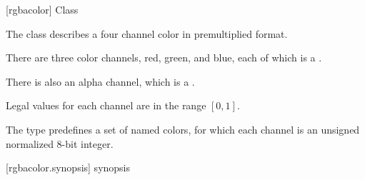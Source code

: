  [rgbacolor] {Class }

\pnum
{}
The class  describes a four channel color in premultiplied format.

\pnum
There are three color channels, red, green, and blue, each of which is a .

\pnum
There is also an alpha channel, which is a .

\pnum
Legal values for each channel are in the range $[0, 1]$.

\pnum
The type predefines a set of named colors, for which each channel is an unsigned normalized 8-bit integer.

 [rgbacolor.synopsis] { synopsis}

